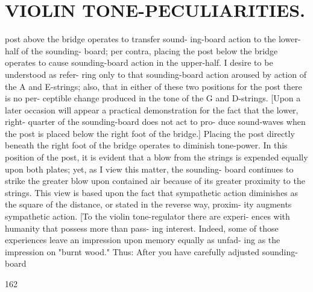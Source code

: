 \documentclass{article}
\begin{document}
\section*{VIOLIN TONE-PECULIARITIES.}
post above the bridge operates to transfer sound- ing-board action to the lower-half of the sounding- board; per contra, placing the post below the bridge operates to cause sounding-board action in the upper-half. I desire to be understood as refer- ring only to that sounding-board action aroused by action of the A and E-strings; also, that in either of these two positions for the post there is no per- ceptible change produced in the tone of the G and D-strings. [Upon a later occasion will appear a practical demonstration for the fact that the lower, right- quarter of the sounding-board does not act to pro- duce sound-waves when the post is placed below the right foot of the bridge.] Placing the post directly beneath the right foot of the bridge operates to diminish tone-power. In this position of the post, it is evident that a blow from the strings is expended equally upon both plates; yet, as I view this matter, the sounding- board continues to strike the greater blow upon contained air because of its greater proximity to the strings. This view is based upon the fact that sympathetic action diminishes as the square of the distance, or stated in the reverse way, proxim- ity augments sympathetic action. [To the violin tone-regulator there are experi- ences with humanity that possess more than pass- ing interest. Indeed, some of those experiences leave an impression upon memory equally as unfad- ing as the impression on "burnt wood." Thus: After you have carefully adjusted sounding-board

162
\end{document}
